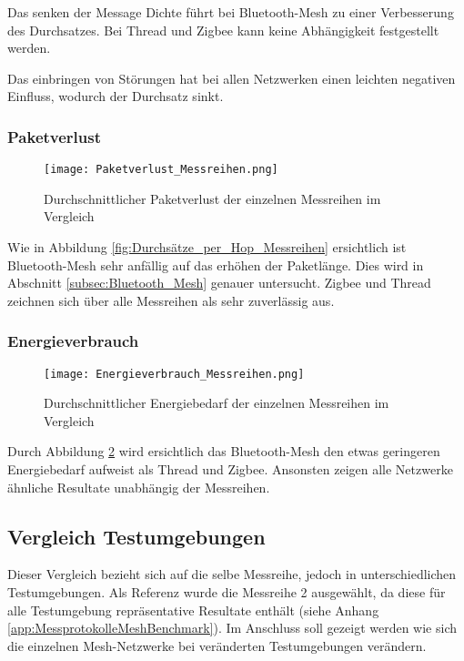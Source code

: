 Das senken der Message Dichte führt bei Bluetooth-Mesh zu einer Verbesserung des Durchsatzes. Bei Thread und Zigbee kann keine Abhängigkeit festgestellt werden.

Das einbringen von Störungen hat bei allen Netzwerken einen leichten negativen Einfluss, wodurch der Durchsatz sinkt. 

\subsubsection{Paketverlust}\label{subsec:VergleichPaketverlustMessreihen}


\begin{figure}
	\centering
	\texttt{[image: Paketverlust\_Messreihen.png]}
	\caption{Durchschnittlicher Paketverlust der einzelnen Messreihen im Vergleich}\label{fig:PaketverlusteMessreihen}
\end{figure}

Wie in Abbildung \ref{fig:Durchsätze_per_Hop_Messreihen} ersichtlich ist Bluetooth-Mesh sehr anfällig auf das erhöhen der Paketlänge. Dies wird in Abschnitt \ref{subsec:Bluetooth_Mesh} genauer untersucht. Zigbee und Thread zeichnen sich über alle Messreihen als sehr zuverlässig aus. 


\subsubsection{Energieverbrauch}\label{subsec:VergleichEnergieverbrauchMessreihen}


\begin{figure}[H]
	\centering
	\texttt{[image: Energieverbrauch\_Messreihen.png]}
	\caption{Durchschnittlicher Energiebedarf der einzelnen Messreihen im Vergleich}\label{fig:EnergieverbrauchMessreihen}
\end{figure}

Durch Abbildung \ref{fig:EnergieverbrauchMessreihen} wird ersichtlich das Bluetooth-Mesh den etwas geringeren Energiebedarf aufweist als Thread und Zigbee. Ansonsten zeigen alle Netzwerke ähnliche Resultate unabhängig der Messreihen. 


\subsection{Vergleich Testumgebungen}\label{subsec:VergleichTestumgebungen}

Dieser Vergleich bezieht sich auf die selbe Messreihe, jedoch in unterschiedlichen Testumgebungen. Als Referenz wurde die Messreihe 2 ausgewählt, da diese für alle Testumgebung repräsentative Resultate enthält (siehe Anhang \ref{app:MessprotokolleMeshBenchmark}). Im Anschluss soll gezeigt werden wie sich die einzelnen Mesh-Netzwerke bei veränderten Testumgebungen verändern.

